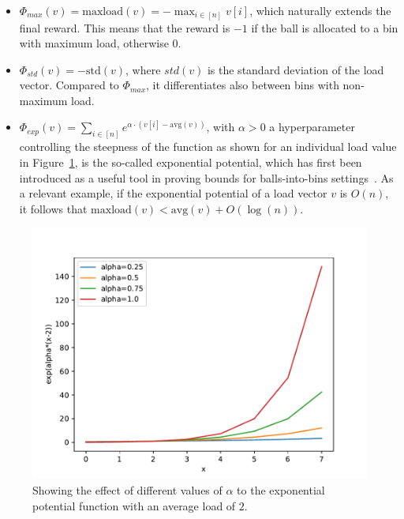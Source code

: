 \begin{itemize}
    \item
    $\Phi_{max}(v)=\mathrm{maxload}(v)=- \max_{i \in [n]} v[i]$, which naturally extends the final reward. This means that the reward is $-1$ if the ball is allocated to a bin with maximum load, otherwise $0$.
    \item
    $\Phi_{std}(v)=-\mathrm{std}(v)$, where $std(v)$ is the standard deviation of the load vector. Compared to $\Phi_{max}$, it differentiates also between bins with non-maximum load.
    \item
    $\Phi_{exp}(v)=\sum_{i \in [n]} e^{\alpha \cdot  (v[i] - \mathrm{avg}(v))}$, with $\alpha>0$ a hyperparameter controlling the steepness of the function as shown for an individual load value in Figure~\ref{exponential-potential-alpha}, is the so-called exponential potential, which has first been introduced as a useful tool in proving bounds for balls-into-bins settings~\cite{ghosh1999exponentialpotential}. As a relevant example, if the exponential potential of a load vector $v$ is $O(n)$, it follows that $\mathrm{maxload}(v) < \mathrm{avg}(v)+O(\log(n))$.
\end{itemize}


\begin{figure}[hbt!]
    \centering
    \includegraphics[scale=0.7]{Chapter3/Figs/exponential_potential_analysis.pdf}
    \caption{Showing the effect of different values of $\alpha$ to the exponential potential function with an average load of $2$.}
    \label{exponential-potential-alpha}
\end{figure}



